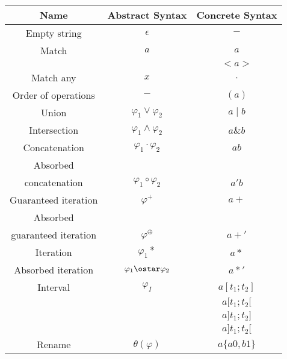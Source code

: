 \begin{tabular}{ |c|c|c| }
    \hline
    \textbf{Name} & \textbf{Abstract Syntax} & \textbf{Concrete Syntax} \\
    \hline
    Empty string & $\epsilon$ & $-$ \\
    \hline
    Match & $a$ & $a$ \\
    && $<a>$ \\
    \hline
    Match any & $x$ & $.$ \\
    \hline
    Order of operations & $-$ & $(a)$ \\
    \hline
    Union & $\varphi_1\vee\varphi_2$ & $a \mid b$ \\
    \hline
    Intersection & $\varphi_1\wedge\varphi_2$ & $a\&b$ \\
    \hline
    Concatenation & $\varphi_1\cdot\varphi_2$ & $ab$ \\
    \hline
    Absorbed & & \\
    concatenation & $\varphi_1\circ\varphi_2$ & $a'b$ \\
    \hline
    Guaranteed iteration & $\varphi^+$ & $a+$ \\
    \hline
    Absorbed & & \\
    guaranteed iteration & $\varphi^\oplus$ & $a+'$ \\
    \hline
    Iteration & $\varphi_1*$ & $a*$ \\
    \hline
    Absorbed iteration & $\varphi_1\ostar\varphi_2$ & $a*'$ \\
    \hline
    Interval & $\varphi_I$ & $a[t_1;t_2]$ \\
    && $a[t_1;t_2[$ \\
    && $a]t_1;t_2]$ \\
    && $a]t_1;t_2[$ \\
    \hline
    Rename & $\theta(\varphi)$ & $a\{a0,b1\}$ \\
    \hline
\end{tabular}